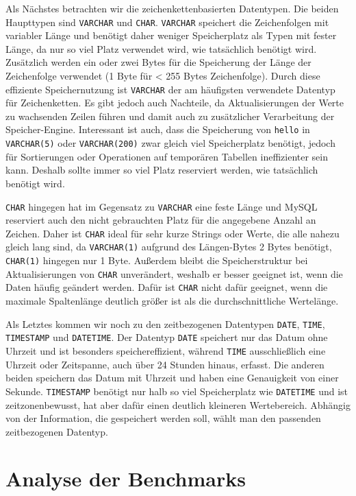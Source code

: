 Als Nächstes betrachten wir die zeichenkettenbasierten Datentypen.
Die beiden Haupttypen sind \texttt{VARCHAR} und \texttt{CHAR}.
\texttt{VARCHAR} speichert die Zeichenfolgen mit variabler Länge und benötigt daher weniger Speicherplatz als Typen mit fester Länge, da nur so viel Platz verwendet wird, wie tatsächlich benötigt wird.
Zusätzlich werden ein oder zwei Bytes für die Speicherung der Länge der Zeichenfolge verwendet (1 Byte für < 255 Bytes Zeichenfolge).
Durch diese effiziente Speichernutzung ist \texttt{VARCHAR} der am häufigsten verwendete Datentyp für Zeichenketten.
Es gibt jedoch auch Nachteile, da Aktualisierungen der Werte zu wachsenden Zeilen führen und damit auch zu zusätzlicher Verarbeitung der Speicher-Engine.
Interessant ist auch, dass die Speicherung von \texttt{hello} in \texttt{VARCHAR(5)} oder \texttt{VARCHAR(200)} zwar gleich viel Speicherplatz benötigt, jedoch für Sortierungen oder Operationen auf temporären Tabellen ineffizienter sein kann.
Deshalb sollte immer so viel Platz reserviert werden, wie tatsächlich benötigt wird.

\texttt{CHAR} hingegen hat im Gegensatz zu \texttt{VARCHAR} eine feste Länge und MySQL reserviert auch den nicht gebrauchten Platz für die angegebene Anzahl an Zeichen.
Daher ist \texttt{CHAR} ideal für sehr kurze Strings oder Werte, die alle nahezu gleich lang sind, da \texttt{VARCHAR(1)} aufgrund des Längen-Bytes 2 Bytes benötigt, \texttt{CHAR(1)} hingegen nur 1 Byte.
Außerdem bleibt die Speicherstruktur bei Aktualisierungen von \texttt{CHAR} unverändert, weshalb er besser geeignet ist, wenn die Daten häufig geändert werden.
Dafür ist \texttt{CHAR} nicht dafür geeignet, wenn die maximale Spaltenlänge deutlich größer ist als die durchschnittliche Wertelänge.

Als Letztes kommen wir noch zu den zeitbezogenen Datentypen \texttt{DATE}, \texttt{TIME}, \texttt{TIMESTAMP} und \texttt{DATETIME}.
Der Datentyp \texttt{DATE} speichert nur das Datum ohne Uhrzeit und ist besonders speichereffizient, während \texttt{TIME} ausschließlich eine Uhrzeit oder Zeitspanne, auch über 24 Stunden hinaus, erfasst.
Die anderen beiden speichern das Datum mit Uhrzeit und haben eine Genauigkeit von einer Sekunde.
\texttt{TIMESTAMP} benötigt nur halb so viel Speicherplatz wie \texttt{DATETIME} und ist zeitzonenbewusst, hat aber dafür einen deutlich kleineren Wertebereich.
Abhängig von der Information, die gespeichert werden soll, wählt man den passenden zeitbezogenen Datentyp.

\section{Analyse der Benchmarks}\label{sec:data-types-analyse-der-benchmarks}

